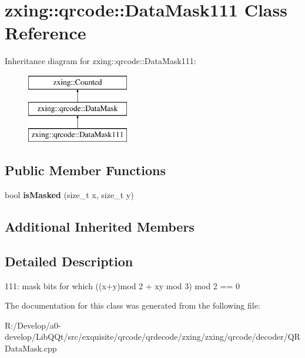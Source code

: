 \hypertarget{classzxing_1_1qrcode_1_1_data_mask111}{}\section{zxing\+:\+:qrcode\+:\+:Data\+Mask111 Class Reference}
\label{classzxing_1_1qrcode_1_1_data_mask111}
Inheritance diagram for zxing\+:\+:qrcode\+:\+:Data\+Mask111\+:\begin{figure}[H]
\begin{center}
\leavevmode
\includegraphics[height=3.000000cm]{classzxing_1_1qrcode_1_1_data_mask111}
\end{center}
\end{figure}
\subsection*{Public Member Functions}
\begin{DoxyCompactItemize}
\item 
\mbox{\label{classzxing_1_1qrcode_1_1_data_mask111_a4134762f7be4942e3355ca17c71fb4a1}} 
bool {\bfseries is\+Masked} (size\+\_\+t x, size\+\_\+t y)
\end{DoxyCompactItemize}
\subsection*{Additional Inherited Members}


\subsection{Detailed Description}
111\+: mask bits for which ((x+y)mod 2 + xy mod 3) mod 2 == 0 

The documentation for this class was generated from the following file\+:\begin{DoxyCompactItemize}
\item 
R\+:/\+Develop/a0-\/develop/\+Lib\+Q\+Qt/src/exquisite/qrcode/qrdecode/zxing/zxing/qrcode/decoder/Q\+R\+Data\+Mask.\+cpp\end{DoxyCompactItemize}
